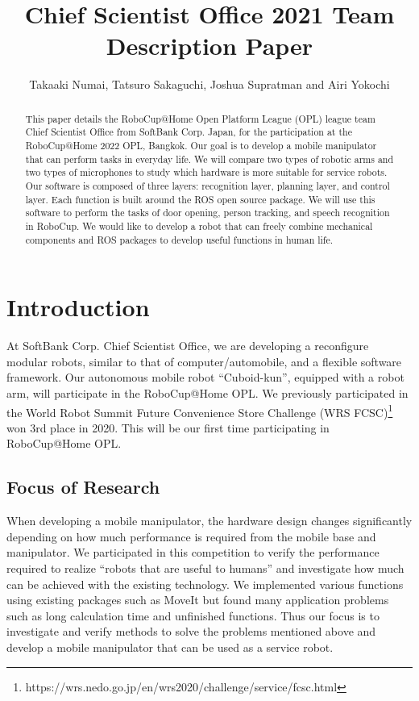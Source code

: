\documentclass[runningheads,a4paper]{llncs}
\title{Chief Scientist Office 2021 Team Description Paper}
\author{Takaaki Numai, Tatsuro Sakaguchi, Joshua Supratman and Airi Yokochi}
\institute{Affiliation name and address, \\
\texttt{http://devoted-web-site.url}}
\begin{document}
\maketitle

%
%

\begin{abstract}
    This paper details the RoboCup@Home Open Platform League (OPL) league team Chief Scientist Office from SoftBank Corp. Japan, for the participation at the RoboCup@Home 2022 OPL, Bangkok. Our goal is to develop a mobile manipulator that can perform tasks in everyday life.
    We will compare two types of robotic arms and two types of microphones to study which hardware is more suitable for service robots.
    Our software is composed of three layers: recognition layer, planning layer, and control layer. Each function is built around the ROS open source package. We will use this software to perform the tasks of door opening, person tracking, and speech recognition in RoboCup.
    We would like to develop a robot that can freely combine mechanical components and ROS packages to develop useful functions in human life.
\end{abstract}



\section{Introduction}
At SoftBank Corp. Chief Scientist Office, we are developing a reconfigure modular robots, similar to that of computer/automobile, and a flexible software framework. Our autonomous mobile robot ``Cuboid-kun'', equipped with a robot arm, will participate in the RoboCup@Home OPL. We previously participated in the World Robot Summit Future Convenience Store Challenge (WRS FCSC)\footnote{https://wrs.nedo.go.jp/en/wrs2020/challenge/service/fcsc.html} won 3rd place in 2020. This will be our first time participating in RoboCup@Home OPL.


\subsection{Focus of Research}
When developing a mobile manipulator, the hardware design changes significantly depending on how much performance is required from the mobile base and manipulator. We participated in this competition to verify the performance required to realize ``robots that are useful to humans'' and investigate how much can be achieved with the existing technology. We implemented various functions using existing packages such as MoveIt but found many application problems such as long calculation time and unfinished functions. Thus our focus is to investigate and verify methods to solve the problems mentioned above and develop a mobile manipulator that can be used as a service robot.
\end{document}
